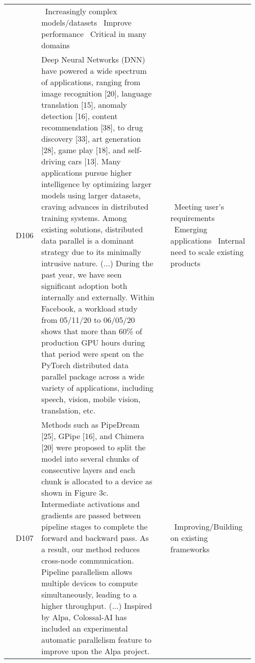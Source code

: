 {\begin{longtable}{|l|p{0.6cm}|p{11.8cm}|p{0.6cm}|p{2cm}|}
	     & \cite{lepikhin_gshard_2020,chen_mxnet_2015, huang_gpipe_2019, shoeybi_megatron-lm_2020}
	     & \textbullet\ Increasingly complex models/datasets \newline \textbullet\ Improve performance \newline \textbullet\ Critical in many domains \\	\cline{2-5}
	     & \label{D106}D106\newline\centering\cite{li_pytorch_2020} & Deep Neural Networks (DNN) have powered a wide spectrum of applications, ranging from image recognition [20], language translation [15], anomaly detection [16], content recommendation [38], to drug discovery [33], art generation [28], game play [18], and self-driving cars [13]. Many applications pursue higher intelligence by optimizing larger models using larger datasets, craving advances in distributed training systems. Among existing solutions, distributed data parallel is a dominant strategy due to its minimally intrusive nature. (...) During the past year, we have seen significant adoption both internally and externally. Within Facebook, a workload study from 05/11/20 to 06/05/20 shows that more than 60\% of production GPU hours during that period were spent on the PyTorch distributed data parallel package across a wide variety of applications, including speech, vision, mobile vision, translation, etc.
	     & \cite{li_pytorch_2020,abadi_tensorflow_2016}
	     & \textbullet\ Meeting user's requirements \newline \textbullet\ Emerging applications \newline \textbullet\ Internal need to scale existing products \\	\cline{2-5}
	     & \label{D107}D107\newline\centering\cite{li_colossal-ai_2023} & Methods such as PipeDream [25], GPipe [16], and Chimera [20] were proposed to split the model into several chunks of consecutive layers and each chunk is allocated to a device as shown in Figure 3c. Intermediate activations and gradients are passed between pipeline stages to complete the forward and backward pass. As a result, our method reduces cross-node communication. Pipeline parallelism allows multiple devices to compute simultaneously, leading to a higher throughput. (...) Inspired by Alpa, Colossal-AI has included an experimental automatic parallelism feature to improve upon the Alpa project.
	     & \cite{li_colossal-ai_2023}
	     & \textbullet\ Improving/Building on existing frameworks \\ \cline{2-5}

\end{longtable}}
